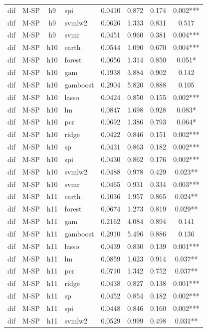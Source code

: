 \begin{ThreePartTable}
\begin{longtable}[t]{llclcccc}
dif & M-SP & h9 & spi & 0.0410 & 0.872 & 0.174 & 0.002***\\
dif & M-SP & h9 & svmlw2 & 0.0626 & 1.333 & 0.831 & 0.517\\
dif & M-SP & h9 & svmr & 0.0451 & 0.960 & 0.381 & 0.004***\\
\addlinespace
dif & M-SP & h10 & earth & 0.0544 & 1.090 & 0.670 & 0.004***\\
dif & M-SP & h10 & forest & 0.0656 & 1.314 & 0.850 & 0.051*\\
dif & M-SP & h10 & gam & 0.1938 & 3.884 & 0.902 & 0.142\\
dif & M-SP & h10 & gamboost & 0.2904 & 5.820 & 0.888 & 0.105\\
dif & M-SP & h10 & lasso & 0.0424 & 0.850 & 0.155 & 0.002***\\
dif & M-SP & h10 & lm & 0.0847 & 1.698 & 0.928 & 0.083*\\
dif & M-SP & h10 & pcr & 0.0692 & 1.386 & 0.793 & 0.064*\\
dif & M-SP & h10 & ridge & 0.0422 & 0.846 & 0.151 & 0.002***\\
dif & M-SP & h10 & sp & 0.0431 & 0.863 & 0.182 & 0.002***\\
dif & M-SP & h10 & spi & 0.0430 & 0.862 & 0.176 & 0.002***\\
dif & M-SP & h10 & svmlw2 & 0.0488 & 0.978 & 0.429 & 0.023**\\
dif & M-SP & h10 & svmr & 0.0465 & 0.931 & 0.334 & 0.003***\\
\addlinespace
dif & M-SP & h11 & earth & 0.1036 & 1.957 & 0.865 & 0.024**\\
dif & M-SP & h11 & forest & 0.0674 & 1.273 & 0.819 & 0.029**\\
dif & M-SP & h11 & gam & 0.2162 & 4.084 & 0.894 & 0.141\\
dif & M-SP & h11 & gamboost & 0.2910 & 5.496 & 0.886 & 0.136\\
dif & M-SP & h11 & lasso & 0.0439 & 0.830 & 0.139 & 0.001***\\
dif & M-SP & h11 & lm & 0.0859 & 1.623 & 0.914 & 0.037**\\
dif & M-SP & h11 & pcr & 0.0710 & 1.342 & 0.752 & 0.037**\\
dif & M-SP & h11 & ridge & 0.0438 & 0.827 & 0.138 & 0.001***\\
dif & M-SP & h11 & sp & 0.0452 & 0.854 & 0.182 & 0.002***\\
dif & M-SP & h11 & spi & 0.0448 & 0.846 & 0.160 & 0.002***\\
dif & M-SP & h11 & svmlw2 & 0.0529 & 0.999 & 0.498 & 0.031**\\

\end{longtable}
\end{ThreePartTable}
